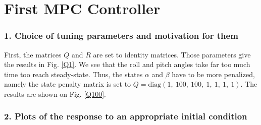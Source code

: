 \documentclass[a4paper]{report}
\begin{document}
\section*{First MPC Controller}
\subsubsection*{1. Choice of tuning parameters and motivation for them}

First, the matrices $Q$ and $R$ are set to identity matrices. Those parameters give the results in Fig. \ref{Q1}. We see that the roll and pitch angles take far too much time too reach steady-state. Thus, the states $\alpha$ and $\beta$ have to be more penalized, namely the state penalty matrix is set to $Q = \text{diag}(1,\ 100,\ 100,\ 1,\ 1,\ 1,\ 1)$. The results are shown on Fig. \ref{Q100}.

\subsubsection*{2. Plots of the response to an appropriate initial condition}
\end{document}
